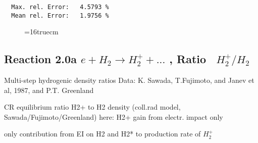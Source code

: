 \documentclass[12pt,dvipdfmx]{article}
\begin{document}
\begin{small}
\begin{verbatim}
  Max. rel. Error:   4.5793 %
  Mean rel. Error:   1.9756 %

\end{verbatim}\end{small}
\begin{figure} \label{7.2e}
\epsfxsize=16truecm
\end{figure}
\newpage

\subsection{
Reaction 2.0a  $e + H_2 \rightarrow H_2^+ + ... $ , Ratio \ $H_2^+/H_2$
}

 Multi-step hydrogenic density ratios
 Data: K. Sawada, T.Fujimoto, \cite{kn:Sawada} and Janev et al, 1987, and P.T. Greenland


  CR equilibrium ratio H2+ to H2 density
  (coll.rad model, Sawada/Fujimoto/Greenland)
 here:  H2+ gain from electr. impact only

  only contribution from  EI on H2 and H2* to production rate of $H_2^+$
\end{document}
